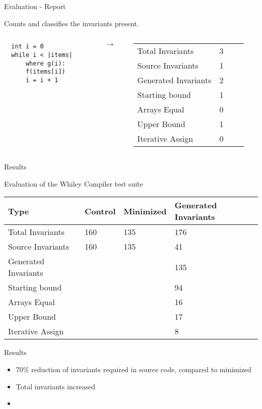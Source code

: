 \begin{frame}[fragile]{Evaluation - Report}

Counts and classifies the invariants present.

\begin{columns}
\begin{column}{0.4\textwidth}
\begin{verbatim}
  int i = 0
  while i < |items|
      where g(i):
      f(items[i])
      i = i + 1
\end{verbatim}
\end{column}

\begin{column}{0.1\textwidth}
    \[\rightarrow\]
\end{column}

\begin{column}{0.5\textwidth}
\begin{longtable}[]{@{}llll@{}}
\midrule
\endhead
Total Invariants & 3\tabularnewline
Source Invariants & 1\tabularnewline
Generated Invariants & 2\tabularnewline
Starting bound & 1\tabularnewline
Arrays Equal & 0\tabularnewline
Upper Bound & 1\tabularnewline
Iterative Assign & 0\tabularnewline
\bottomrule
\end{longtable}


\end{column}
\end{columns}

\end{frame}



\begin{frame}{Results}

Evaluation of the Whiley Compiler test suite

\begin{longtable}[]{@{}llll@{}}
\toprule
Type & Control & Minimized & Generated Invariants\tabularnewline
\midrule
\endhead
Total Invariants & 160 & 135 & 176\tabularnewline
Source Invariants & 160 & 135 & 41\tabularnewline
Generated Invariants & & & 135\tabularnewline
Starting bound & & & 94\tabularnewline
Arrays Equal & & & 16\tabularnewline
Upper Bound & & & 17\tabularnewline
Iterative Assign & & & 8\tabularnewline
\bottomrule
\end{longtable}

\end{frame}



\begin{frame}{Results}

\begin{itemize}
\item 70\% reduction of invariants required in source code, compared to
    minimized
\item Total invariants increased
\item
\end{itemize}

\end{frame}



